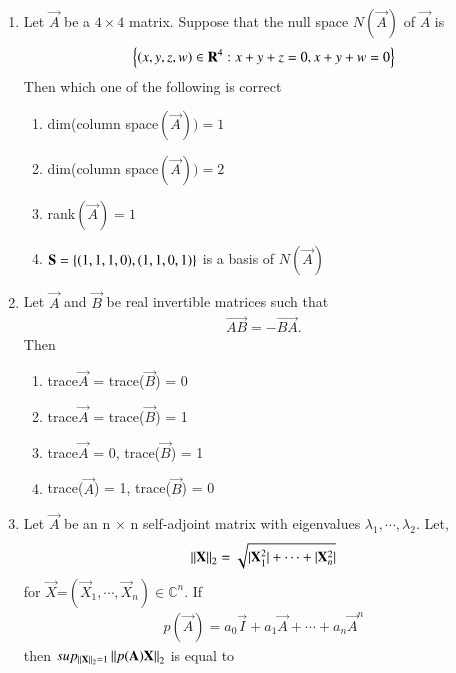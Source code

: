 \renewcommand{\theequation}{\theenumi}
\renewcommand{\thefigure}{\theenumi}
\begin{enumerate}[label=\thesection.\arabic*.,ref=\thesection.\theenumi]

\item 	Let $\vec{A}$ be a $4 \times 4$ matrix. Suppose that the null space $N(\vec{A})$ of $\vec{A}$ is
	\begin{align}
		\left\{(x,y,z,w) \in \mathbf{R}^4 : x + y + z = 0 , x + y + w = 0\right\}
	\end{align}
Then which one of the following is correct
\begin{enumerate}
\item  dim(column space$(\vec{A})) = 1$ 
\item dim(column space$(\vec{A})) = 2$
\item rank$(\vec{A}) = 1$
\item $\mathbf{S}= \left\{(1, 1, 1, 0), (1, 1, 0, 1)\right\}$ is a basis of $N(\vec{A})$
\end{enumerate}
%
%
\solution

\item Let $\vec{A}$ and $\vec{B}$ be real invertible matrices such that 
\begin{align}
    \vec{AB}=-\vec{BA}\label{eq:eq:solutions/2017/june/28/eq1}.
\end{align}
Then
\begin{enumerate}
    \item trace{$\vec{A}$} = trace($\vec{B}$) = 0
    \item trace{$\vec{A}$} = trace($\vec{B}$) = 1
    \item trace{$\vec{A}$} = 0, trace($\vec{B}$) = 1
    \item trace($\vec{A}$) = 1, trace($\vec{B}$) = 0
\end{enumerate}
%
\solution

\item Let $\vec{A}$ be an n $\times$ n self-adjoint matrix with eigenvalues $\lambda_1, \cdots, \lambda_2$.
Let,\begin{align} \left\lVert\mathbf{X}\right\rVert_2=\sqrt{\vert\mathbf{X}_{1}^{2}\vert+\cdots+\vert\mathbf{X}_{n}^{2}\vert}\end{align} for $\vec{X}$=$(\vec{X}_{1},\cdots,\vec{X}_{n})\in \mathbb{C}^n$. If \begin{align}
p(\vec{A})=a_0\vec{I}+a_1\vec{A}+\cdots+a_n\vec{A}^n
\end{align}
then $sup_{\left\lVert\mathbf{X}\right\rVert_{2}=1}\left\lVert p(\mathbf{A})\mathbf{X}\right\rVert_2$ is equal to

\end{enumerate}
